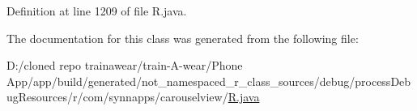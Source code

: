 Definition at line 1209 of file R.\+java.



The documentation for this class was generated from the following file\+:\begin{DoxyCompactItemize}
\item 
D\+:/cloned repo trainawear/train-\/\+A-\/wear/\+Phone App/app/build/generated/not\+\_\+namespaced\+\_\+r\+\_\+class\+\_\+sources/debug/process\+Debug\+Resources/r/com/synnapps/carouselview/\mbox{\hyperlink{process_debug_resources_2r_2com_2synnapps_2carouselview_2_r_8java}{R.\+java}}\end{DoxyCompactItemize}
